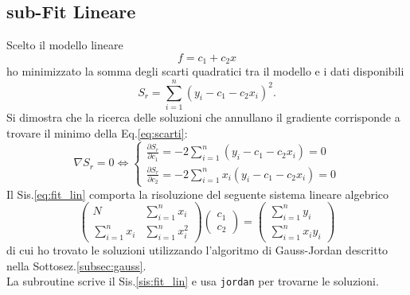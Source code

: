 \documentclass{article}
\numberwithin{equation}{subsection}
\begin{document}
\subsection{sub-Fit Lineare}\label{sub:lin}
\vspace{0.2 cm}
Scelto il modello lineare 
\begin{equation}
    f=c_1+c_2x
\end{equation}
ho minimizzato la somma degli scarti quadratici tra il modello e i dati disponibili
\begin{equation}\label{eq:scarti}
    S_r=\sum\limits_{i=1}^{n}(y_i-c_1-c_2x_i)^2.
\end{equation}
Si dimostra che la ricerca delle soluzioni che annullano il gradiente corrisponde a trovare il minimo della Eq.\ref{eq:scarti}:
\begin{equation} \label{eq:fit_lin}
    \nabla S_r=0 \Leftrightarrow 
    \left\{
    \begin{array}{l}
        \frac{\partial S_r}{\partial c_1}=-2\sum\limits_{i=1}^{n}(y_i-c_1-c_2x_i)=0
        \\
        \frac{\partial S_r}{\partial c_2}=-2\sum\limits_{i=1}^{n}x_i(y_i-c_1-c_2x_i)=0 
    \end{array}
    \right.
\end{equation}
Il Sis.\ref{eq:fit_lin} comporta la risoluzione del seguente sistema lineare algebrico
\begin{equation} \label{sis:fit_lin}
    \begin{pmatrix}
         N  &  \sum\limits_{i=1}^{n}x_i
         \\
         \sum\limits_{i=1}^{n}x_i  &  \sum\limits_{i=1}^{n}x_i^2 
    \end{pmatrix} %
    \begin{pmatrix}
         c_1\\
         c_2 
    \end{pmatrix} = 
    \begin{pmatrix}
         \sum\limits_{i=1}^{n}y_i\\
         \sum\limits_{i=1}^{n}x_iy_i 
    \end{pmatrix}
\end{equation}
di cui ho trovato le soluzioni utilizzando l'algoritmo di Gauss-Jordan descritto nella Sottosez.\ref{subsec:gauss}.\\
La subroutine scrive il Sis.\ref{sis:fit_lin} e usa \texttt{jordan} per trovarne le soluzioni.
\end{document}
